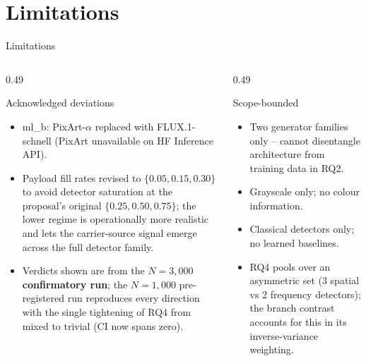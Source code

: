 \documentclass[aspectratio=169,11pt]{beamer}
\begin{document}
\section{Limitations}
\begin{frame}{Limitations}
\small
\begin{columns}[T]
\begin{column}{0.49\textwidth}
\begin{block}{Acknowledged deviations}
\begin{itemize}
\item ml\_b: PixArt-$\alpha$ replaced with FLUX.1-schnell (PixArt unavailable on HF Inference API).
\item Payload fill rates revised to $\{0.05, 0.15, 0.30\}$ to avoid detector saturation at the proposal's original $\{0.25, 0.50, 0.75\}$; the lower regime is operationally more realistic and lets the carrier-source signal emerge across the full detector family.
\item Verdicts shown are from the \textbf{$N\!=\!3{,}000$ confirmatory run}; the $N\!=\!1{,}000$ pre-registered run reproduces every direction with the single tightening of RQ4 from mixed to trivial (CI now spans zero).
\end{itemize}
\end{block}
\end{column}
\begin{column}{0.49\textwidth}
\begin{block}{Scope-bounded}
\begin{itemize}
\item Two generator families only -- cannot disentangle architecture from training data in RQ2.
\item Grayscale only; no colour information.
\item Classical detectors only; no learned baselines.
\item RQ4 pools over an asymmetric set (3 spatial vs 2 frequency detectors); the branch contrast accounts for this in its inverse-variance weighting.
\end{itemize}
\end{block}
\end{column}
\end{columns}
\end{frame}

\end{document}
